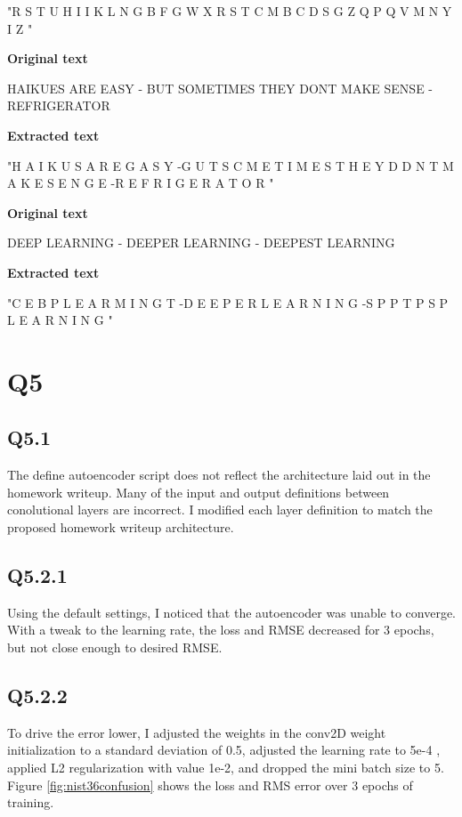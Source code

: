 \documentclass[12pt]{article}
\begin{document}
"R S T U  H I I K L  N G  B F G  W X  R S T C  M B C D  S G  Z  Q  P Q  V  M N  Y  I Z  "

\bigskip

\textbf { Original text }

HAIKUES ARE EASY - BUT SOMETIMES THEY DONT MAKE SENSE - REFRIGERATOR

\bigskip

\textbf { Extracted text }

"H A I K U S A R E G A S Y -G U T S C M E T I M E S T H E Y D D N T M A K E S E N G E -R E F R I G E R A T O R "
 
\bigskip
\textbf { Original text }

DEEP LEARNING  - DEEPER LEARNING - DEEPEST LEARNING

\bigskip

\textbf { Extracted text }

"C E B P L E A R M I N G T -D E E P E R L E A R N I N G -S P P T P S P L E A R N I N G "

\section{Q5}
\subsection{Q5.1}
The define autoencoder script does not reflect the architecture laid out in the homework writeup. Many of the input and output definitions between conolutional layers are incorrect. I modified each layer definition to match the proposed homework writeup architecture.

\subsection{Q5.2.1}
Using the default settings, I noticed that the autoencoder was unable to converge. With a tweak to the learning rate, the loss and RMSE decreased for 3 epochs, but not close enough to desired RMSE. 

\subsection{Q5.2.2}
To drive the error lower, I adjusted the weights in the conv2D weight initialization to a standard deviation of 0.5, adjusted the learning rate to 5e-4 , applied L2 regularization with value 1e-2, and dropped the mini batch size to 5. Figure \ref{fig:nist36confusion} shows the loss and RMS error over 3 epochs of training.
\end{document}
